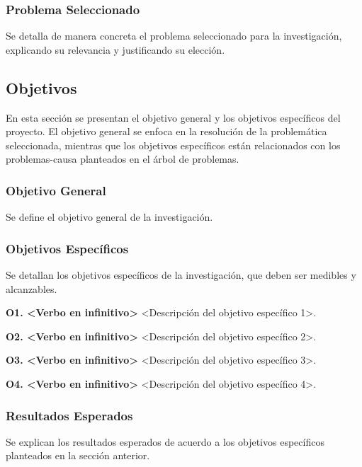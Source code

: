 \subsubsection{Problema Seleccionado}

Se detalla de manera concreta el problema seleccionado para la investigación, explicando su relevancia y
justificando su elección.

\subsection{Objetivos}
\label{subsec:objetivos}

En esta sección se presentan el objetivo general y los objetivos específicos del proyecto. El objetivo general
se enfoca en la resolución de la problemática seleccionada, mientras que los objetivos específicos están relacionados con
los problemas-causa planteados en el árbol de problemas.

\subsubsection{Objetivo General}
\label{subsubsec:objetivo_general}

Se define el objetivo general de la investigación.

\subsubsection{Objetivos Específicos}
\label{subsubsec:objetivos_especificos}

Se detallan los objetivos específicos de la investigación, que deben ser medibles y alcanzables.

\textbf{O1. <Verbo en infinitivo>} <Descripción del objetivo específico 1>.

\textbf{O2. <Verbo en infinitivo>} <Descripción del objetivo específico 2>.

\textbf{O3. <Verbo en infinitivo>} <Descripción del objetivo específico 3>.

\textbf{O4. <Verbo en infinitivo>} <Descripción del objetivo específico 4>.

\subsubsection{Resultados Esperados}
\label{subsubsec:resultados_esperados}

Se explican los resultados esperados de acuerdo a los objetivos específicos planteados en la sección anterior.


